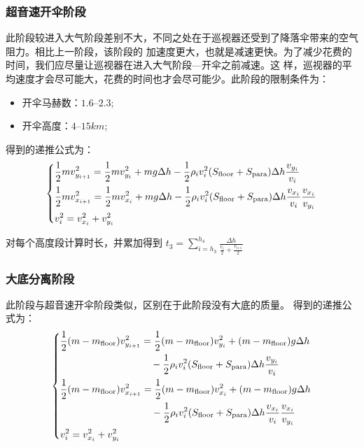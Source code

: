 \documentclass[hyperref,a4paper,UTF8]{ctexart}
\begin{document}
\subsubsection{超音速开伞阶段}
此阶段较进入大气阶段差别不大，不同之处在于巡视器还受到了降落伞带来的空气阻力。相比上一阶段，该阶段的
加速度更大，也就是减速更快。为了减少花费的时间，我们应尽量让巡视器在进入大气阶段---开伞之前减速。这
样，巡视器的平均速度才会尽可能大，花费的时间也才会尽可能少。此阶段的限制条件为：
\begin{itemize}
    \item 开伞马赫数：$1.6$--$2.3$; 
    \item 开伞高度：$4$--$15km$;
\end{itemize}
得到的递推公式为：
\[
    \begin{dcases}
        \frac{1}{2}mv_{y_{i + 1}}^2 = \frac{1}{2}mv_{y_{i}}^2 + mg\Delta h -
        \frac{1}{2}\rho _iv_i^2(S_{\text{floor}}+S_{\text{para}})\Delta h\frac{v_{y_i}}{v_i} \\
        \frac{1}{2}mv_{x_{i + 1}}^2 = \frac{1}{2}mv_{x_{i}}^2 + mg\Delta h -
        \frac{1}{2}\rho _iv_i^2(S_{\text{floor}}+S_{\text{para}})\Delta h\frac{v_{x_i}}{v_i}
        \frac{v_{x_i}}{v_{y_i}}                                                              \\
        v_i^2 = v_{x_i}^2 + v_{y_i}^2
    \end{dcases}
\]

对每个高度段计算时长，并累加得到
$
    \displaystyle t_3=\sum_{i=h_3}^{h_4}{\displaystyle\frac{\Delta h}{\frac{\displaystyle v_i}
        {\displaystyle 2}+\frac{\displaystyle v_{\textrm{i+1}} }{\displaystyle 2}}}
$

\subsubsection{大底分离阶段}
此阶段与超音速开伞阶段类似，区别在于此阶段没有大底的质量。
得到的递推公式为：
\[
    \begin{dcases}
        \begin{split}
            \frac{1}{2}(m-m_{\text{floor}})v_{y_{i + 1}}^2 &=
            \frac{1}{2}(m-m_{\text{floor}})v_{y_{i}}^2 +
            (m-m_{\text{floor}})g\Delta h \\ &\quad - \frac{1}{2}\rho
            _iv_i^2(S_{\text{floor}}+S_{\text{para}})
            \Delta h\frac{v_{y_i}}{v_i}
        \end{split}
        \\
        \begin{split}
            \frac{1}{2}(m-m_{\text{floor}})v_{x_{i + 1}}^2 &=
            \frac{1}{2}(m-m_{\text{floor}})v_{x_{i}}^2 +
            (m-m_{\text{floor}})g\Delta h \\ &\quad -\frac{1}{2}
            \rho _iv_i^2(S_{\text{floor}}+S_{\text{para}})\Delta h
            \frac{v_{x_i}}{v_i}\frac{v_{x_i}}{v_{y_i}}
        \end{split}
        \\
        v_i^2 = v_{x_i}^2 + v_{y_i}^2 \\
    \end{dcases}
\]
\end{document}
